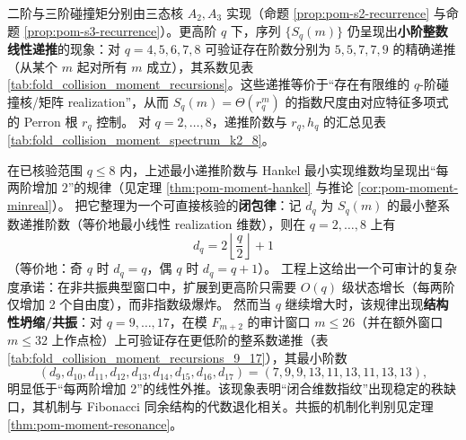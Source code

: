 \begin{remark}\label{rem:pom-moment-rec}
二阶与三阶碰撞矩分别由三态核 \(A_2,A_3\) 实现（命题 \ref{prop:pom-s2-recurrence} 与命题 \ref{prop:pom-s3-recurrence}）。更高阶 \(q\) 下，序列 \(\{S_q(m)\}\) 仍呈现出\textbf{小阶整数线性递推}的现象：对 \(q=4,5,6,7,8\) 可验证存在阶数分别为 \(5,5,7,7,9\) 的精确递推（从某个 \(m\) 起对所有 \(m\) 成立），其系数见表 \ref{tab:fold_collision_moment_recursions}。这些递推等价于“存在有限维的 \(q\)-阶碰撞核/矩阵 realization”，从而 \(S_q(m)=\Theta(r_q^m)\) 的指数尺度由对应特征多项式的 Perron 根 \(r_q\) 控制。
对 \(q=2,\dots,8\)，递推阶数与 \(r_q,h_q\) 的汇总见表 \ref{tab:fold_collision_moment_spectrum_k2_8}。


在已核验范围 \(q\le 8\) 内，上述最小递推阶数与 Hankel 最小实现维数均呈现出“每两阶增加 \(2\)”的规律（见定理 \ref{thm:pom-moment-hankel} 与推论 \ref{cor:pom-moment-minreal}）。
把它整理为一个可直接核验的\textbf{闭包律}：记 \(d_q\) 为 \(S_q(m)\) 的最小整系数递推阶数（等价地最小线性 realization 维数），则在 \(q=2,\dots,8\) 上有
\[
\boxed{\;
d_q = 2\left\lfloor \frac{q}{2}\right\rfloor+1\;}
\]
（等价地：奇 \(q\) 时 \(d_q=q\)，偶 \(q\) 时 \(d_q=q+1\)）。
工程上这给出一个可审计的复杂度承诺：在非共振典型窗口中，扩展到更高阶只需要 \(O(q)\) 级状态增长（每两阶仅增加 2 个自由度），而非指数级爆炸。
然而当 \(q\) 继续增大时，该规律出现\textbf{结构性坍缩/共振}：对 \(q=9,\dots,17\)，在模 \(F_{m+2}\) 的审计窗口 \(m\le 26\)（并在额外窗口 \(m\le 32\) 上作点检）上可验证存在更低阶的整系数递推（表 \ref{tab:fold_collision_moment_recursions_9_17}），其最小阶数
\[
(d_9,d_{10},d_{11},d_{12},d_{13},d_{14},d_{15},d_{16},d_{17})=(7,9,9,13,11,13,11,13,13),
\]
明显低于“每两阶增加 2”的线性外推。该现象表明“闭合维数指纹”出现稳定的秩缺口，其机制与 Fibonacci 同余结构的代数退化相关。共振的机制化判别见定理 \ref{thm:pom-moment-resonance}。
\end{remark}

